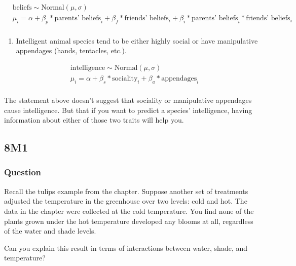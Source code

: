 \documentclass[
]{book}
\providecommand{\tightlist}{%
  \setlength{\itemsep}{0pt}\setlength{\parskip}{0pt}}
\begin{document}
\[
\begin{aligned}
&\text{beliefs} \sim \text{Normal}(\mu,\sigma) \\
&\mu_i = \alpha + \beta_{p} * \text{parents' beliefs}_i + \beta_f * \text{friends' beliefs}_i + \beta_i * \text{parents' beliefs}_i*\text{friends' beliefs}_i  \\
\end{aligned}
\]

\begin{enumerate}
\def\labelenumi{\arabic{enumi}.}
\setcounter{enumi}{3}
\tightlist
\item
  Intelligent animal species tend to be either highly social or have manipulative appendages (hands, tentacles, etc.).
\end{enumerate}

\[
\begin{aligned}
&\text{intelligence} \sim \text{Normal}(\mu,\sigma) \\
&\mu_i = \alpha + \beta_{s} * \text{sociality}_i + \beta_a * \text{appendages}_i  \\
\end{aligned}
\]

The statement above doesn't suggest that sociality or manipulative appendages cause intelligence. But that if you want to predict a species' intelligence, having information about either of those two traits will help you.

\hypertarget{m1-5}{%
\subsection*{8M1}\label{m1-5}}

\hypertarget{question-78}{%
\subsubsection*{Question}\label{question-78}}

Recall the tulips example from the chapter. Suppose another set of treatments adjusted the temperature in the greenhouse over two levels: cold and hot.
The data in the chapter were collected at the cold temperature. You find none of the plants grown under the hot temperature developed any blooms at all, regardless of the water and shade levels.

Can you explain this result in terms of interactions between water, shade, and temperature?
\end{document}
